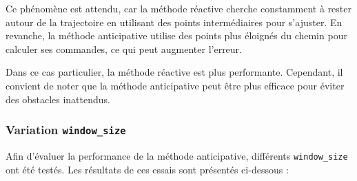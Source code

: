 \documentclass[../CSC_5RO16_TA_TP4.tex]{subfiles}
\begin{document}
\noindent Ce phénomène est attendu, car la méthode réactive cherche constamment à rester autour de la trajectoire en utilisant des points intermédiaires pour s'ajuster. En revanche, la méthode anticipative utilise des points plus éloignés du chemin pour calculer ses commandes, ce qui peut augmenter l'erreur.

\begin{remark}
    Dans ce cas particulier, la méthode réactive est plus performante. Cependant, il convient de noter que la méthode anticipative peut être plus efficace pour éviter des obstacles inattendus.
\end{remark}

\subsubsection{Variation \texttt{window\_size}}
\noindent Afin d'évaluer la performance de la méthode anticipative, différents \texttt{window\_size} ont été testés. Les résultats de ces essais sont présentés ci-dessous :
\end{document}
